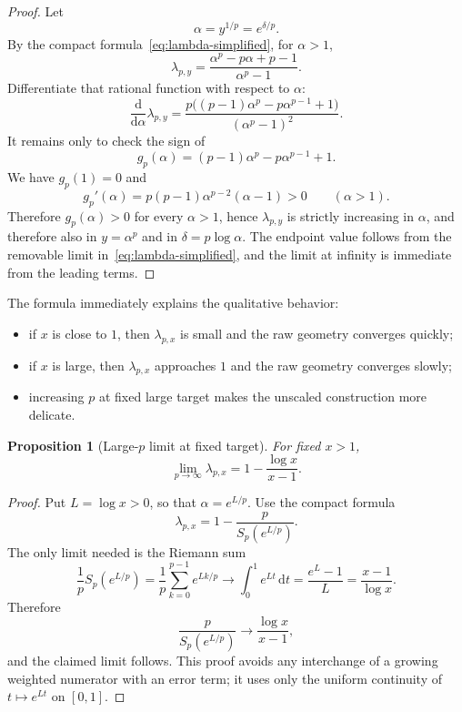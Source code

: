 \documentclass[10pt,a4paper]{article}
\theoremstyle{plain}
\newtheorem{proposition}[theorem]{Proposition}
\theoremstyle{definition}
\theoremstyle{remark}
\newcommand{\dd}{\mathrm{d}}
\begin{document}
\begin{proof}
Let
\[
  \alpha=y^{1/p}=e^{\delta/p}.
\]
By the compact formula~\eqref{eq:lambda-simplified}, for $\alpha>1$,
\[
  \lambda_{p,y}
  =\frac{\alpha^p-p\alpha+p-1}{\alpha^p-1}.
\]
Differentiate that rational function with respect to $\alpha$:
\[
  \frac{\dd}{\dd\alpha}\lambda_{p,y}
  =\frac{p\bigl((p-1)\alpha^p-p\alpha^{p-1}+1\bigr)}
         {(\alpha^p-1)^2}.
\]
It remains only to check the sign of
\[
  g_p(\alpha)=(p-1)\alpha^p-p\alpha^{p-1}+1.
\]
We have $g_p(1)=0$ and
\[
  g_p'(\alpha)=p(p-1)\alpha^{p-2}(\alpha-1)>0
  \qquad(\alpha>1).
\]
Therefore $g_p(\alpha)>0$ for every $\alpha>1$, hence
$\lambda_{p,y}$ is strictly increasing in $\alpha$, and therefore also in
$y=\alpha^p$ and in $\delta=p\log\alpha$.  The endpoint value follows from the
removable limit in~\eqref{eq:lambda-simplified}, and the limit at infinity is
immediate from the leading terms.
\end{proof}

The formula immediately explains the qualitative behavior:

\begin{itemize}
  \item if $x$ is close to $1$, then $\lambda_{p,x}$ is small and the raw
  geometry converges quickly;
  \item if $x$ is large, then $\lambda_{p,x}$ approaches $1$ and the raw
  geometry converges slowly;
  \item increasing $p$ at fixed large target makes the unscaled construction
  more delicate.
\end{itemize}

\begin{proposition}[Large-$p$ limit at fixed target]
For fixed $x>1$,
\[
  \lim_{p\to\infty}\lambda_{p,x}
  =1-\frac{\log x}{x-1}.
\]
\end{proposition}

\begin{proof}
Put $L=\log x>0$, so that $\alpha=e^{L/p}$.  Use the compact formula
\[
  \lambda_{p,x}=1-\frac{p}{S_p(e^{L/p})}.
\]
The only limit needed is the Riemann sum
\[
  \frac{1}{p}S_p(e^{L/p})
  =\frac1p\sum_{k=0}^{p-1} e^{Lk/p}
  \longrightarrow \int_0^1 e^{Lt}\,\dd t
  =\frac{e^L-1}{L}
  =\frac{x-1}{\log x}.
\]
Therefore
\[
  \frac{p}{S_p(e^{L/p})}
  \longrightarrow
  \frac{\log x}{x-1},
\]
and the claimed limit follows.  This proof avoids any interchange of a growing
weighted numerator with an error term; it uses only the uniform continuity of
$t\mapsto e^{Lt}$ on $[0,1]$.
\end{proof}
\end{document}
